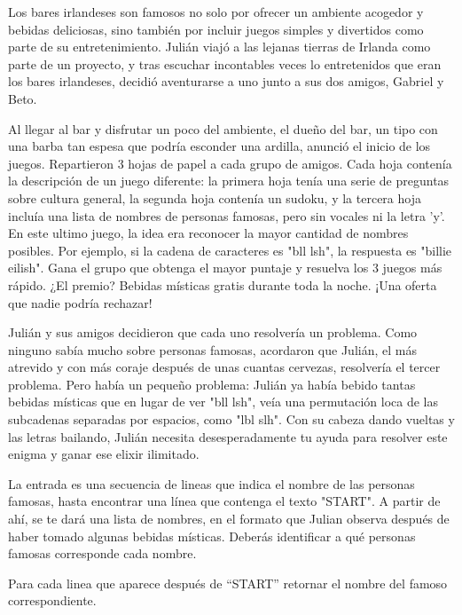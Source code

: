 
Los bares irlandeses son famosos no solo por ofrecer un ambiente acogedor y bebidas deliciosas, sino también por incluir juegos simples y divertidos como parte de su entretenimiento. Julián viajó a las lejanas tierras de Irlanda como parte de un proyecto, y tras escuchar incontables veces lo entretenidos que eran los bares irlandeses, decidió aventurarse a uno junto a sus dos amigos, Gabriel y Beto.

Al llegar al bar y disfrutar un poco del ambiente, el dueño del bar, un tipo con una barba tan espesa que podría esconder una ardilla, anunció el inicio de los juegos. Repartieron $3$ hojas de papel a cada grupo de amigos. Cada hoja contenía la descripción de un juego diferente: la primera hoja tenía una serie de preguntas sobre cultura general, la segunda hoja contenía un sudoku, y la tercera hoja incluía una lista de nombres de personas famosas, pero sin vocales ni la letra 'y'. En este ultimo juego, la idea era reconocer la mayor cantidad de nombres posibles. Por ejemplo, si la cadena de caracteres es "bll lsh", la respuesta es "billie eilish". Gana el grupo que obtenga el mayor puntaje y resuelva los 3 juegos más rápido. ¿El premio? Bebidas místicas gratis durante toda la noche. ¡Una oferta que nadie podría rechazar!

Julián y sus amigos decidieron que cada uno resolvería un problema. Como ninguno sabía mucho sobre personas famosas, acordaron que Julián, el más atrevido y con más coraje después de unas cuantas cervezas, resolvería el tercer problema. Pero había un pequeño problema: Julián ya había bebido tantas bebidas místicas que en lugar de ver "bll lsh", veía una permutación loca de las subcadenas separadas por espacios, como "lbl slh". Con su cabeza dando vueltas y las letras bailando, Julián necesita desesperadamente tu ayuda para resolver este enigma y ganar ese elixir ilimitado.


La entrada es una secuencia de lineas que indica el nombre de las personas famosas, hasta encontrar una línea que contenga el texto "START". A partir de ahí, se te dará una lista de nombres, en el formato que Julian observa después de haber tomado algunas bebidas místicas. Deberás identificar a qué personas famosas corresponde cada nombre.

\outputText

Para cada linea que aparece después de “START” retornar el nombre del famoso correspondiente.

\exampleCases

\begin{example}
\end{example}
